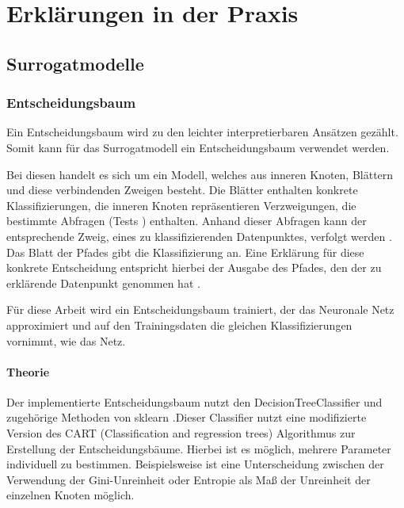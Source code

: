 \chapter{Erklärungen in der Praxis}
\label{chapter: kap3}

\section{Surrogatmodelle}
\label{section: 3.Surrogat}

\subsection{Entscheidungsbaum}
\label{subsection: DT}
Ein Entscheidungsbaum wird zu den leichter interpretierbaren Ansätzen \cite{InterpretableMLMolnar} gezählt. Somit kann für das Surrogatmodell ein Entscheidungsbaum verwendet werden. 

Bei diesen handelt es sich um ein Modell, welches aus inneren Knoten, Blättern und diese verbindenden Zweigen besteht. Die Blätter enthalten konkrete Klassifizierungen, die inneren Knoten repräsentieren Verzweigungen, die bestimmte Abfragen (Tests \cite{RastogiDexicionTree}) enthalten. Anhand dieser Abfragen kann der entsprechende Zweig, eines zu klassifizierenden Datenpunktes, verfolgt werden \cite{RastogiDexicionTree}. Das Blatt der Pfades gibt die Klassifizierung an. Eine Erklärung für diese konkrete Entscheidung entspricht hierbei der Ausgabe des Pfades, den der zu erklärende Datenpunkt genommen hat \cite{NguyenDecisionTree}.

Für diese Arbeit wird ein Entscheidungsbaum trainiert, der das Neuronale Netz approximiert und auf den Trainingsdaten die gleichen Klassifizierungen vornimmt, wie das Netz.

\subsubsection{Theorie}
\label{subsubsection: DT Theorie}
Der implementierte Entscheidungsbaum nutzt den DecisionTreeClassifier und zugehörige Methoden von sklearn .Dieser Classifier nutzt eine modifizierte Version des CART (Classification and regression trees) Algorithmus  zur Erstellung der Entscheidungsbäume. Hierbei ist es möglich, mehrere Parameter individuell zu bestimmen. Beispielsweise ist eine Unterscheidung zwischen der Verwendung der Gini-Unreinheit oder Entropie als Maß der Unreinheit der einzelnen Knoten möglich.  \cite{}

